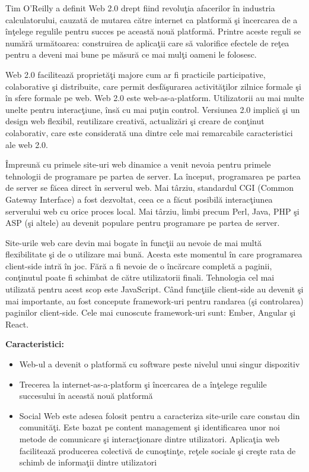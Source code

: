 \documentclass[12pt, a4paper]{report}
\begin{document}
Tim O'Reilly a definit Web 2.0 drept fiind revolu\c tia afacerilor \^ in industria calculatorului, cauzat\u a de mutarea c\u atre internet ca platform\u a \c si \^ incercarea de a \^ in\c telege regulile pentru succes pe aceast\u a nou\u a platform\u a. Printre aceste reguli se num\u ar\u a urm\u atoarea: construirea de aplica\c tii care s\u a valorifice efectele de re\c tea pentru a deveni mai bune pe m\u asur\u a ce mai mul\c ti oameni le folosesc. \cite{oreilly}

Web 2.0 faciliteaz\u a propriet\u a\c ti majore cum ar fi practicile participative, colaborative \c si distribuite, care permit desf\u a\c surarea activit\u a\c tilor zilnice formale \c si \^in sfere formale pe web. Web 2.0 este web-as-a-platform. Utilizatorii au mai multe unelte pentru interac\c tiune, \^ins\u a cu mai pu\c tin control. Versiunea 2.0 implic\u a \c si un design web flexibil, reutilizare creativ\u a, actualiz\u ari \c si creare de con\c tinut colaborativ, care este considerat\u a una dintre cele mai remarcabile caracteristici ale web 2.0.

\^ Impreun\u a cu primele site-uri web dinamice a venit nevoia pentru primele tehnologii de programare pe partea de server. La \^ inceput, programarea pe partea de server se f\u acea direct \^ in serverul web. Mai t\^ arziu, standardul CGI (Common Gateway Interface) a fost dezvoltat, ceea ce a f\u acut posibil\u a interac\c tiunea serverului web cu orice proces local.
Mai t\^ arziu, limbi precum Perl, Java, PHP \c si ASP (\c si altele) au devenit populare pentru programare pe partea de server.

Site-urile web care devin mai bogate \^ in func\c tii au nevoie de mai mult\u a flexibilitate \c si de o utilizare mai bun\u a. Acesta este momentul \^ in care programarea client-side intr\u a \^ in joc. F\u ar\u a a fi nevoie de o \^ inc\u arcare complet\u a a paginii, con\c tinutul poate fi schimbat de c\u atre utilizatorii finali. Tehnologia cel mai utilizat\u a pentru acest scop este JavaScript.
C\^ and func\c tiile client-side au devenit \c si mai importante, au fost concepute framework-uri pentru randarea (\c si controlarea) paginilor client-side. Cele mai cunoscute framework-uri sunt: Ember, Angular \c si React.

\textbf{Caracteristici:}
\begin{itemize}
	\item Web-ul a devenit o platform\u a cu software peste nivelul unui singur dispozitiv
	\item Trecerea la internet-as-a-platform \c si \^incercarea de a \^in\c telege regulile succesului \^in aceast\u a nou\u a platform\u a
	\item Social Web este adesea folosit pentru a caracteriza site-urile care constau din comunit\u a\c ti. Este bazat pe content management \c si identificarea unor noi metode de comunicare \c si interac\c tionare dintre utilizatori. Aplica\c tia web faciliteaz\u a producerea colectiv\u a de cuno\c stin\c te, re\c tele sociale \c si cre\c ste rata de schimb de informa\c tii dintre utilizatori
\end{itemize}
\end{document}
